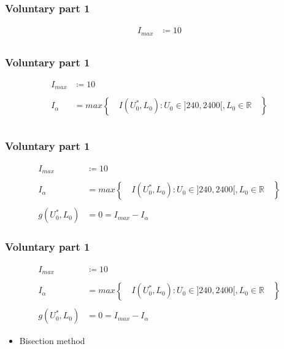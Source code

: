 \documentclass[aspectratio=1610]{beamer}
\begin{document}
\begin{frame}
\large
\frametitle{Voluntary part 1}
	\begin{align*}
		I_{max}&\coloneqq 10\\
	\end{align*}
\end{frame}
\begin{frame}
\large
\frametitle{Voluntary part 1}
	\begin{align*}
		I_{max}&\coloneqq 10\\ \\
		I_{\alpha} &= max \left\lbrace \quad I(U^{*}_{0},L_{0}):U_{0}	\in]240,2400[,L_{0}\in \mathbb{R} \quad\right\rbrace\\ \\
	\end{align*}
\end{frame}
\begin{frame}
\large
\frametitle{Voluntary part 1}
	\begin{align*}
		I_{max}&\coloneqq 10\\ \\
		I_{\alpha} &= max \left\lbrace \quad I(U^{*}_{0},L_{0}):U_{0}	\in]240,2400[,L_{0}\in \mathbb{R} \quad\right\rbrace\\ \\
		g(U^{*}_{0},L_{0})&=0=I_{max}-I_{\alpha}
	\end{align*}
\end{frame}
\begin{frame}
\large
\frametitle{Voluntary part 1}
	\begin{align*}
		I_{max}&\coloneqq 10\\ \\
		I_{\alpha} &= max \left\lbrace \quad I(U^{*}_{0},L_{0}):U_{0}	\in]240,2400[,L_{0}\in \mathbb{R} \quad\right\rbrace\\ \\
		g(U^{*}_{0},L_{0})&=0=I_{max}-I_{\alpha}
	\end{align*}
\begin{itemize}
	\item<1-> Bisection method
\end{itemize}
\end{frame}
\end{document}
